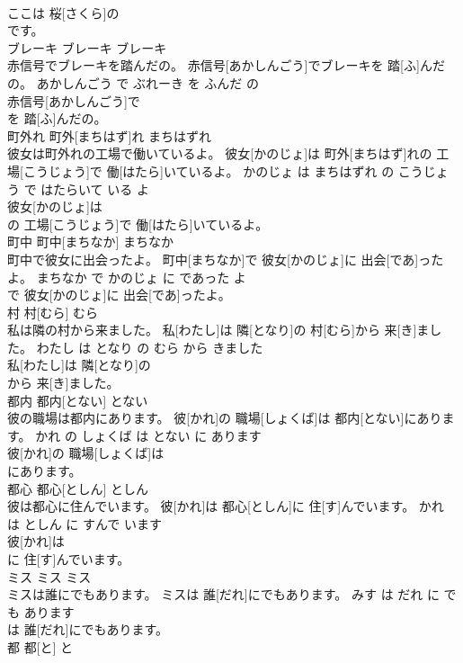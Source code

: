 \documentclass[8pt]{extreport}
\begin{document}
\begin{CJK}{UTF8}{min}
\\	ここは 桜[さくら]の
\\	です。			
\\	ブレーキ	ブレーキ	ブレーキ	
\\	赤信号でブレーキを踏んだの。	赤信号[あかしんごう]でブレーキを 踏[ふ]んだの。	あかしんごう で ぶれーき を ふんだ の	
\\	赤信号[あかしんごう]で
\\	を 踏[ふ]んだの。			
\\	町外れ	町外[まちはず]れ	まちはずれ	
\\	彼女は町外れの工場で働いているよ。	彼女[かのじょ]は 町外[まちはず]れの 工場[こうじょう]で 働[はたら]いているよ。	かのじょ は まちはずれ の こうじょう で はたらいて いる よ	
\\	彼女[かのじょ]は
\\	の 工場[こうじょう]で 働[はたら]いているよ。			
\\	町中	町中[まちなか]	まちなか	
\\	町中で彼女に出会ったよ。	町中[まちなか]で 彼女[かのじょ]に 出会[であ]ったよ。	まちなか で かのじょ に であった よ	
\\	で 彼女[かのじょ]に 出会[であ]ったよ。			
\\	村	村[むら]	むら	
\\	私は隣の村から来ました。	私[わたし]は 隣[となり]の 村[むら]から 来[き]ました。	わたし は となり の むら から きました	
\\	私[わたし]は 隣[となり]の
\\	から 来[き]ました。			
\\	都内	都内[とない]	とない	
\\	彼の職場は都内にあります。	彼[かれ]の 職場[しょくば]は 都内[とない]にあります。	かれ の しょくば は とない に あります	
\\	彼[かれ]の 職場[しょくば]は
\\	にあります。			
\\	都心	都心[としん]	としん	
\\	彼は都心に住んでいます。	彼[かれ]は 都心[としん]に 住[す]んでいます。	かれ は としん に すんで います	
\\	彼[かれ]は
\\	に 住[す]んでいます。			
\\	ミス	ミス	ミス	
\\	ミスは誰にでもあります。	ミスは 誰[だれ]にでもあります。	みす は だれ に で も あります	
\\	は 誰[だれ]にでもあります。			
\\	都	都[と]	と	

\end{CJK}
\end{document}
